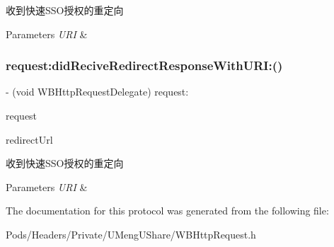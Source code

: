 收到快速\+S\+S\+O授权的重定向


\begin{DoxyParams}{Parameters}
{\em U\+RI} & \\
\hline
\end{DoxyParams}
\mbox{\label{protocol_w_b_http_request_delegate_01-p_a6ffae01d073b8ac55c7bdf8e62ca9576}} 
\subsubsection{\texorpdfstring{request\+:did\+Recive\+Redirect\+Response\+With\+U\+R\+I\+:()}{request:didReciveRedirectResponseWithURI:()}\hspace{0.1cm}{\footnotesize\ttfamily [3/3]}}
{\footnotesize\ttfamily -\/ (void W\+B\+Http\+Request\+Delegate) request\+: \begin{DoxyParamCaption}\item[{(\mbox{\hyperlink{interface_w_b_http_request}{W\+B\+Http\+Request}} $\ast$)}]{request }\item[{didReciveRedirectResponseWithURI:(N\+S\+U\+RL $\ast$)}]{redirect\+Url }\end{DoxyParamCaption}\hspace{0.3cm}{\ttfamily [optional]}}

收到快速\+S\+S\+O授权的重定向


\begin{DoxyParams}{Parameters}
{\em U\+RI} & \\
\hline
\end{DoxyParams}


The documentation for this protocol was generated from the following file\+:\begin{DoxyCompactItemize}
\item 
Pods/\+Headers/\+Private/\+U\+Meng\+U\+Share/W\+B\+Http\+Request.\+h\end{DoxyCompactItemize}
